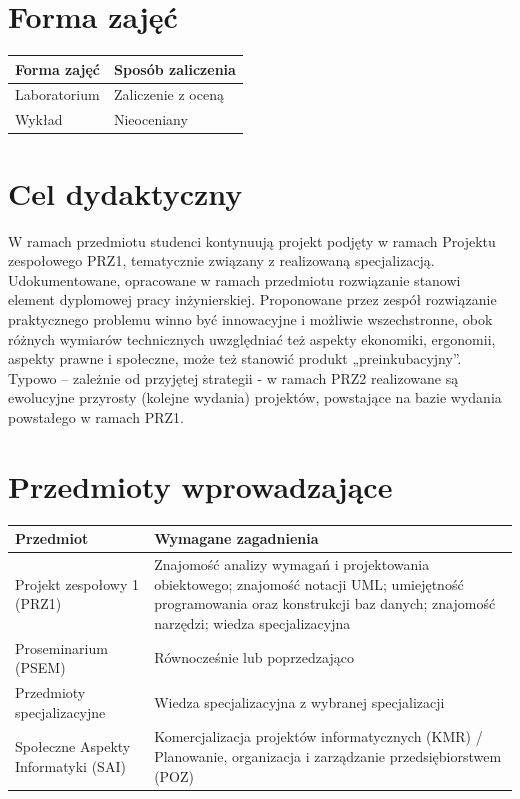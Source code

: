 \documentclass[12pt, a4paper]{article}
\begin{document}
\section{Forma zajęć}

\begin{tabular}{ll}
  \hline
  \textbf{Forma zajęć} & \textbf{Sposób zaliczenia} \\
  \hline
  Laboratorium & Zaliczenie z oceną \\
  Wykład & Nieoceniany \\
  \hline
\end{tabular}

\section{Cel dydaktyczny}

W ramach przedmiotu studenci kontynuują projekt podjęty w ramach Projektu zespołowego PRZ1, tematycznie związany z realizowaną specjalizacją. Udokumentowane, opracowane w ramach przedmiotu rozwiązanie stanowi element dyplomowej pracy inżynierskiej. Proponowane przez zespół rozwiązanie praktycznego problemu winno być innowacyjne i możliwie wszechstronne, obok różnych wymiarów technicznych uwzględniać też aspekty ekonomiki, ergonomii, aspekty prawne i społeczne, może też stanowić produkt „preinkubacyjny”. Typowo – zależnie od przyjętej strategii -  w ramach PRZ2 realizowane są ewolucyjne przyrosty (kolejne wydania) projektów, powstające na bazie wydania powstałego w ramach PRZ1.

\section{Przedmioty wprowadzające}

\begin{tabularx}{\textwidth}{lX}
  \hline
  \textbf{Przedmiot} & \textbf{Wymagane zagadnienia} \\
  \hline
  Projekt zespołowy 1 (PRZ1) & Znajomość analizy wymagań i projektowania obiektowego; znajomość notacji UML; umiejętność programowania oraz konstrukcji baz danych; znajomość narzędzi; wiedza specjalizacyjna \\
  Proseminarium (PSEM) & Równocześnie lub poprzedzająco \\
  Przedmioty specjalizacyjne & Wiedza specjalizacyjna z wybranej specjalizacji \\
  Społeczne Aspekty Informatyki (SAI) & Komercjalizacja projektów informatycznych (KMR) / Planowanie, organizacja i zarządzanie przedsiębiorstwem (POZ) \\
  \hline
\end{tabularx}
\end{document}
